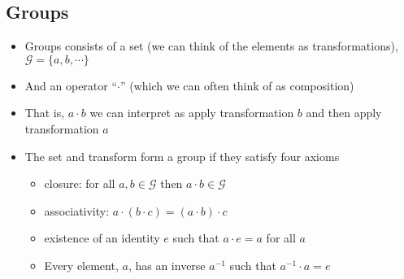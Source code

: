 
\begin{slide}
\section{Groups}

\begin{PauseHighLight}
  \begin{itemize}
  \item Groups consists of a set (we can think of the elements as
    transformations), $\mathcal{G} = \{a,b,\cdots\}$\pause
  \item And an operator ``$\cdot$'' (which we can often think of as
    composition)\pause
  \item That is, $a\cdot b$ we can interpret as apply transformation
    $b$ and then apply transformation $a$\pause
  \item The set and transform form a group if they satisfy four axioms
    \begin{itemize}
    \item closure: for all $a, b \in \mathcal{G}$ then $a\cdot b \in \mathcal{G}$
    \item associativity: $a\cdot (b\cdot c) = (a\cdot b) \cdot c$
    \item existence of an identity $e$ such that $a\cdot e = a$ for
      all $a$
    \item Every element, $a$, has an inverse $a^{-1}$ such that
      $a^{-1}\cdot a = e$\pause
    \end{itemize}
  \end{itemize}
\end{PauseHighLight}

\end{slide} 



